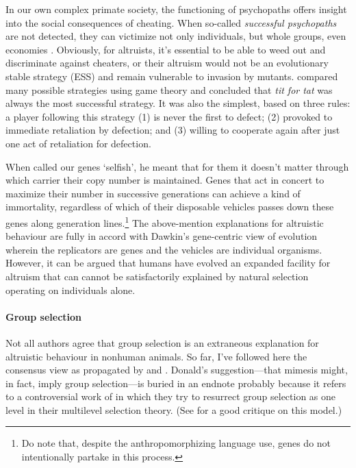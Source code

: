 \documentclass{article}
\begin{document}
In our own complex primate society, the functioning of psychopaths offers
insight into the social consequences of cheating. When so-called
\emph{successful psychopaths} are not detected, they can victimize not only
individuals, but whole groups, even economies \citep{babiak1995, boddy2006,
boddy2010, kirkman2005}. Obviously, for altruists, it's essential to be able to
weed out and discriminate against cheaters, or their altruism would not be an
evolutionary stable strategy (ESS) and remain vulnerable to invasion by
mutants. \citet*{axelrod1981} compared many possible strategies using game
theory and concluded that \emph{tit for tat} was always the most successful
strategy. It was also the simplest, based on three rules: a player following
this strategy (1) is never the first to defect; (2) provoked to immediate
retaliation by defection; and (3) willing to cooperate again after just one act
of retaliation for defection.

When \citet{dawkins1976} called our genes ‘selfish’, he meant that for them it
doesn't matter through which carrier their copy number is maintained. Genes
that act in concert to maximize their number in successive generations can
achieve a kind of immortality, regardless of which of their disposable vehicles
passes down these genes along generation lines.\footnote{Do note that, despite the
anthropomorphizing language use, genes do not intentionally partake in this
process.} The above-mention explanations for altruistic behaviour are fully in
accord with Dawkin's gene-centric view of evolution wherein the replicators are
genes and the vehicles are individual organisms. However, it can be argued that
humans have evolved an expanded facility for altruism that can cannot be
satisfactorily explained by natural selection operating on individuals
alone.

\paragraph{Group selection}

Not all authors agree that group selection is an extraneous explanation for
altruistic behaviour in nonhuman animals. So far, I've followed here the
consensus view as propagated by \citet{hamilton1964} and \citet{dawkins1976}.
Donald's suggestion---that mimesis might, in fact, imply group selection---is
buried in an endnote \citep[p.~338]{donald2001} probably because it refers to a
controversial work of \citet{sober1999} in which they try to resurrect group
selection as one level in their multilevel selection theory. (See
\citealp{dennett2002} for a good critique on this model.)
\end{document}
